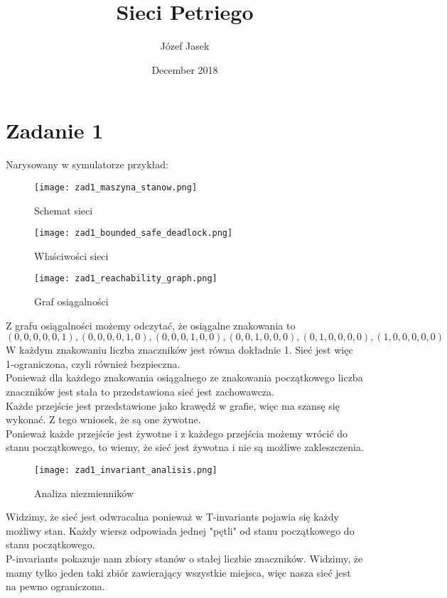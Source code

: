 \documentclass{article}
\title{Sieci Petriego}
\author{Józef Jasek}
\date{December 2018}
\begin{document}
\maketitle

\section{Zadanie 1}
Narysowany w symulatorze przykład:

\begin{figure}[H]
\centering
\texttt{[image: zad1\_maszyna\_stanow.png]}
\caption{Schemat sieci}
\end{figure}

\begin{figure}[H]
\centering
\texttt{[image: zad1\_bounded\_safe\_deadlock.png]}
\caption{Właściwości sieci}
\end{figure}

\begin{figure}[H]
\centering
\texttt{[image: zad1\_reachability\_graph.png]}
\caption{Graf osiągalności}
\end{figure}

Z grafu osiągalności możemy odczytać, że osiągalne znakowania to
\[ (0,0,0,0,0,1), (0,0,0,0,1,0), (0,0,0,1,0,0), (0,0,1,0,0,0), (0,1,0,0,0,0), (1,0,0,0,0,0) \]
W każdym znakowaniu liczba znaczników jest równa dokładnie 1. Sieć jest więc 1-ograniczona, czyli również bezpieczna. \\
Ponieważ dla każdego znakowania osiągalnego ze znakowania początkowego liczba znaczników jest stała to przedstawiona sieć jest zachowawcza. \\
Każde przejście jest przedstawione jako krawędź w grafie, więc ma szansę się wykonać. Z tego wniosek, że są one żywotne. \\
Ponieważ każde przejście jest żywotne i z każdego przejścia możemy wrócić do stanu początkowego, to wiemy, że sieć jest żywotna i nie są możliwe zakleszczenia.

\begin{figure}[H]
\centering
\texttt{[image: zad1\_invariant\_analisis.png]}
\caption{Analiza niezmienników}
\end{figure}

Widzimy, że sieć jest odwracalna ponieważ w T-invariants pojawia się każdy możliwy stan. Każdy wiersz odpowiada jednej "pętli" od stanu początkowego do stanu początkowego. \\
P-invariants pokazuje nam zbiory stanów o stałej liczbie znaczników. Widzimy, że mamy tylko jeden taki zbiór zawierający wszystkie miejsca, więc nasza sieć jest na pewno ograniczona.
\end{document}
